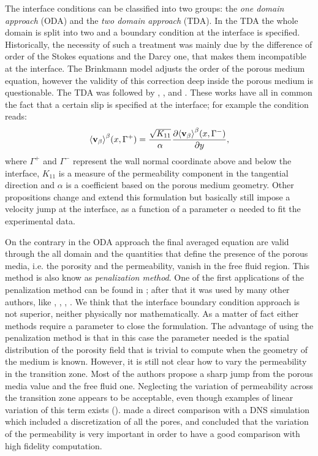 The interface conditions can be classified into two groups: the \textit{one domain approach} (ODA) and the \textit{two domain approach} (TDA).
In the TDA the whole domain is split into two and a boundary condition at the interface is specified. Historically, the necessity of such a treatment was mainly due by the difference of order of the Stokes equations and the Darcy one, that makes them incompatible at the interface.
The Brinkmann model adjusts the order of the porous medium equation, however the validity of this correction deep inside the porous medium is questionable.
The TDA was followed by \citet{beaver}, \citet{mikelic2000interface}, \citet{ochoa1995momentum} and \citet{le2006interfacial}.
These works have all in common the fact that a certain slip is specified at the interface; for example the \citet{beaver} condition reads:
$$
{\left< \textbf{v}_{\beta} \right>}^{\beta}(x,\Gamma^+) = \dfrac{\sqrt{K_{11}}}{\alpha} \dfrac{\partial {\left< \textbf{v}_{\beta}\right>}^{\beta}(x, \Gamma^-)}{\partial y},
$$
where $\Gamma^+$ and $\Gamma^-$ represent the wall normal coordinate above and below the interface, $K_{11}$ is a measure of the permeability component in the tangential direction and $\alpha$ is a coefficient based on the porous medium geometry.
Other propositions change and extend this formulation but basically still impose a velocity jump at the interface, as a function of a parameter $\alpha$ needed to fit the experimental data.

On the contrary in the ODA approach the final averaged equation are valid through the all domain and the quantities that define the presence of the porous media, i.e. the porosity and the permeability, vanish in the free fluid region.
This method is also know as \textit{penalization method}. One of the first applications of the penalization method can be found in \citet{caltagirone1994interaction}; after that it was used by many other authors, like \citet{bruneau2004passive}, \citet{bruneau2008numerical}, \citet{bruneau2010coupling}, \citet{hussong2011continuum}.
We think that the interface boundary condition approach is not superior, neither physically nor mathematically.
As a matter of fact either methods require a parameter to close the formulation. The advantage of using the penalization method is that in this case the parameter needed is the spatial distribution of the porosity field that is trivial to compute when the geometry of the medium is known.
However, it is still not clear how to vary the permeability in the transition zone. Most of the authors propose a sharp jump from the porous media value and the free fluid one. Neglecting the variation of permeability across the transition zone appears to be acceptable, even though examples of linear variation of this term exists (\citet{caltagirone1994interaction}).
\citet{hussong2011continuum} made a direct comparison with a DNS simulation which included a discretization of all the pores, and concluded that the variation of the permeability is very important in order to have a good comparison with high fidelity computation.

